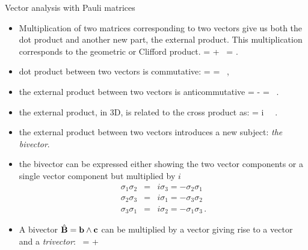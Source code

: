 \documentclass[handout,10pt]{beamer}
\begin{document}
\begin{frame}[fragile]{Vector analysis with Pauli matrices}
\begin{itemize}
\item Multiplication of two matrices corresponding to two vectors give us both the dot product and another new part, the external product. \alert{This multiplication corresponds to the geometric or Clifford product.
%
\be \label{funids}
\Ba  \Bb =  \Ba \cdot \Bb + \Ba \wedge \Bb \, = \ta \tb.
\ee
%
}
\item \alert{dot product} between two vectors \alert{is commutative}: 
%
\be \label{intdef}
\Ba \cdot \Bb = \Bb \cdot \Ba =  \, ,
\ee
%
\item \alert{the external product} between two vectors \alert{is anticommutative}
%
\be \label{extdef}
\Ba \wedge \Bb = - \Bb \wedge \Ba = \, .
\ee
%
\item the external product, in 3D, is related to the cross product as:
%
\be \label{epcross3}
\Ba \wedge \Bb =  i \, \Ba \times \Bb \, .
\ee
%
\end{itemize}

\end{frame}

\begin{frame}[fragile]{}
\begin{itemize}
\item the external product between two vectors introduces a new subject:  \emph{the bivector}.
\item the bivector can be expressed either showing the two vector components or a single vector component but multiplied by $i$ 
%
\begin {eqnarray}
\sigma_1 \sigma_2 &=& i \sigma_3  = - \sigma_2 \sigma_1 \nonumber \\
\sigma_2 \sigma_3 &=& i \sigma_1 =  - \sigma_3  \sigma_2\nonumber \\
\sigma_3 \sigma_1 &=&  i \sigma_2 =  - \sigma_1  \sigma_3 \,.
\label{sigmacomb}
 \end{eqnarray}
\item 
A bivector $\hat{\mathbf{B}} = \mathbf{b} \wedge \mathbf{c}$ can be multiplied by a vector giving rise to a vector and a \emph{trivector}:
\be \label{aB}
\Ba \, \hat{\BB} = \Ba \cdot \hat{\BB} + \Ba \wedge \hat{\BB}
\ee
\end{itemize}

\end{frame}
\end{document}
